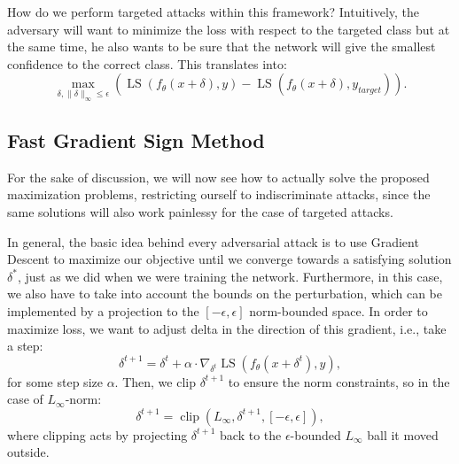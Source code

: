 \documentclass[LaM,binding=0.6cm]{./packages/sapthesis/sapthesis}
\begin{document}
        How do we perform targeted attacks within this framework? Intuitively, the adversary will want to minimize the loss with respect to the targeted class but at the same time, he also wants 
        to be sure that the network will give the smallest confidence to the correct class. This translates into:
        \begin{equation}
            \label{targetedattack}
            \displaystyle{\max_{\delta, \|\delta\|_{\infty} \leq \epsilon }  (\operatorname{LS}(f_{\theta}(x + \delta), y) - \operatorname{LS}(f_{\theta}(x + \delta), y_{target}) )  }.
        \end{equation} 

    \subsection{Fast Gradient Sign Method}
        \label{fgsm}

        For the sake of discussion, we will now see how to actually solve the proposed maximization problems, restricting ourself to indiscriminate attacks, since the same solutions will also
        work painlessy for the case of targeted attacks. 

        In general, the basic idea behind every adversarial attack is to use Gradient Descent to maximize our objective until we converge towards a satisfying solution $\delta^{*}$,
        just as we did when we were training the network. Furthermore, in this case, we also have to take into account the bounds on the perturbation, which can be implemented by a projection  
        to the $[-\epsilon, \epsilon]$ norm-bounded space. In order to maximize loss, we want to adjust delta in the direction of this gradient, i.e., take a step:
        \begin{equation}
            \label{pgd}
            \delta^{t+1} = \delta^t + \alpha \cdot \nabla_{\delta^t} \operatorname{LS}\left(f_{\theta}(x+\delta^t), y\right),
        \end{equation}
        for some step size $\alpha$. Then, we clip $\delta^{t+1}$ to ensure the norm constraints, so in the case of $L_{\infty}$-norm:
        \begin{equation}
            \delta^{t+1} = \operatorname{clip} (L_{\infty}, \delta^{t+1}, [-\epsilon, \epsilon]),
        \end{equation}
        where clipping acts by projecting $\delta^{t+1}$ back to the $\epsilon$-bounded $L_{\infty}$ ball it moved outside.
\end{document}
